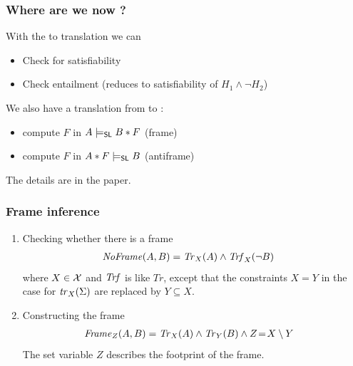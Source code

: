 \documentclass{beamer}
\begin{document}
\begin{frame}
  \frametitle{Where are we now ?}
  With the \JoshLogic to \LRJQ translation we can
  \begin{itemize}
  \item Check for satisfiability
  \item Check entailment (reduces to satisfiability of $H_1 \land \neg H_2$)
  \end{itemize}

  \vspace{3ex}

  We also have a translation from \LRJQ to \JoshLogic:
  \begin{itemize}
  \item compute $F$ in $A \tightentails B*F$ (frame)
  \item compute $F$ in $A*F \tightentails B$ (antiframe)
  \end{itemize}
  The details are in the paper.
  
\end{frame}

\iffalse
\begin{frame}
  \frametitle{Frame inference}
\begin{enumerate}
\item Checking whether there is a frame
\begin{align*}
\mathit{NoFrame}(A,B) & = \trfull{A}{X} \land \ftrfull_X(\neg B)
\end{align*}
where $X \in \vars$ and $\ftrfull$ is like $\mathit{Tr}$, except that the constraints $X=Y$ in the case for $\tr_X(\Sigma)$ are replaced by $Y \subseteq X$.\\[3ex]
  
\item Constructing the frame
\begin{align*}
\mathit{Frame}_Z(A,B) & = \trfull{A}{X} \land \trfull{B}{Y} \land Z\!=\!X \setminus Y  
\end{align*}
The set variable $Z$ describes the footprint of the frame.
\end{enumerate}

\end{frame}
\end{document}
